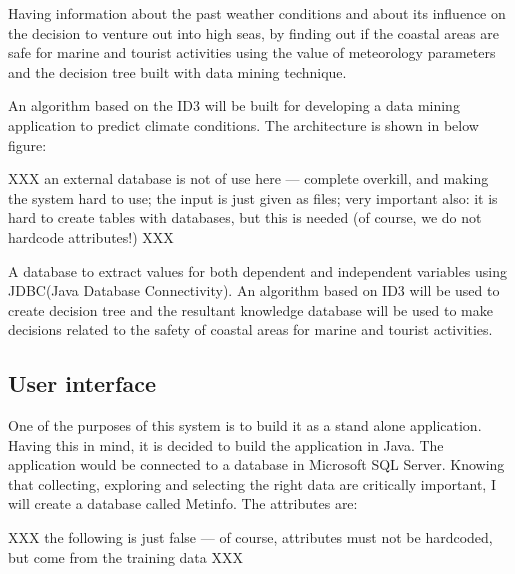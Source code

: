 \documentclass{article}
\begin{document}
Having information about the past weather conditions and about its influence on the decision to venture out into high
seas, by finding out if the coastal areas are safe for marine and tourist activities using the value of meteorology parameters and the decision tree built with data mining technique.

An algorithm based on the ID3 will be built for developing a data mining application to predict climate conditions.
The architecture is shown in below figure:

XXX an external database is not of use here --- complete overkill, and making
the system hard to use; the input is just given as files; very important also:
it is hard to create tables with databases, but this is needed (of course,
we do not hardcode attributes!) XXX

 A database to extract values for both dependent and independent variables using JDBC(Java Database Connectivity).
An algorithm based on ID3 will be used to create decision tree and the resultant knowledge database will be used to make decisions related to the safety of coastal areas for marine and tourist activities.

\subsection{User interface}

One of the purposes of this system is to build it as a stand alone application. Having this in mind, it is decided to build the application in Java. The application would be connected to a database in Microsoft SQL Server. Knowing that collecting, exploring and selecting the right data are critically important, I will create a database called Metinfo.
The attributes are:

XXX the following is just false --- of course, attributes must not be
hardcoded, but come from the training data XXX
\end{document}
